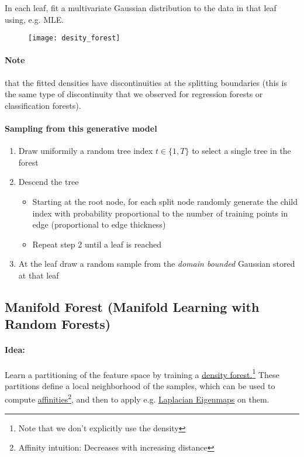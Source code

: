 In each leaf, fit a multivariate Gaussian distribution to the data in that leaf using, e.g. MLE.

\begin{figure}[H]
  \centering
  \texttt{[image: desity\_forest]}
\end{figure}

\paragraph{Note} that the fitted densities have discontinuities at the splitting boundaries (this is the same type of discontinuity that we observed for regression forests or classification forests).

\paragraph{Sampling from this generative model}
\begin{enumerate}
    \item Draw uniformily a random tree index \(t \in \{1, T\}\) to select a single tree in the forest
    \item Descend the tree
        \begin{itemize}
            \item Starting at the root node, for each split node randomly generate the child index with probability proportional to the number of training points in edge (proportional to edge thickness)
            \item Repeat step 2 until a leaf is reached
        \end{itemize}
    \item At the leaf draw a random sample from the \textit{domain bounded} Gaussian stored at that leaf
\end{enumerate}

\newpage
\subsection*{Manifold Forest (Manifold Learning with Random Forests)}
\paragraph{Idea:} Learn a partitioning of the feature space by training a \underline{density forest.}\footnote{Note that we don't explicitly use the density} These partitions define a local neighborhood of the samples, which can be used to compute \underline{affinities}\footnote{Affinity intuition: Decreases with increasing distance}, and then to apply e.g. \underline{Laplacian Eigenmaps} on them.

